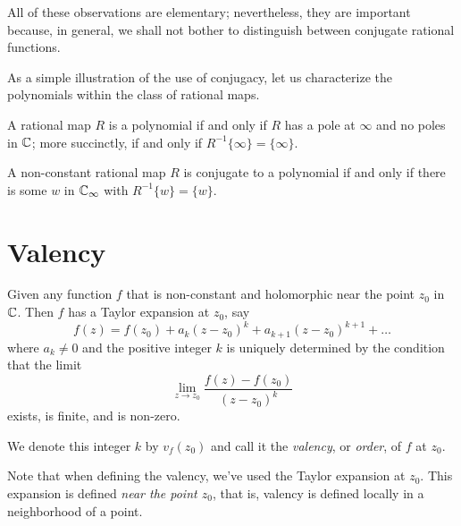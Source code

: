 All of these observations are elementary; nevertheless, they are important
because, in general, we shall not bother to distinguish between conjugate
rational functions.

As a simple illustration of the use of conjugacy, let us characterize the
polynomials within the class of rational maps.

\begin{remark}
    A rational map $R$ is a polynomial if and only if $R$ has a pole at $\infty$
    and no poles in $\mathbb{C}$; more succinctly, if and only if $R^{-1}\{\infty\} =
    \{\infty\}$.
\end{remark}

\begin{theorem}
    \label{thm:characterization_of_the_conjugacy_class_of_the_polynomials}
    A non-constant rational map $R$ is conjugate to a polynomial if and only if
    there is some $w$ in $\mathbb{C}_\infty$ with $R^{-1}\{w\} = \{w\}$.
\end{theorem}

\section{Valency}
\label{sec:valency}

Given any function $f$ that is non-constant and holomorphic near the point $z_0$
in $\mathbb{C}$. Then $f$ has a Taylor expansion at $z_0$, say
\begin{equation*}
    f(z) = f(z_0) + a_k(z-z_0)^k + a_{k+1}(z-z_0)^{k+1} + \dots
\end{equation*}
where $a_k \neq 0$ and the positive integer $k$ is uniquely determined by the
condition that the limit
\begin{equation*}
    \lim_{z \to z_0} \frac{f(z)-f(z_0)}{(z-z_0)^k}
\end{equation*}
exists, is finite, and is non-zero. 

\begin{definition}[Valency of $f$ at $z_0 \in \C$]
    \label{def:valency_in_C}
    We denote this integer $k$ by $v_f(z_0)$ and call it the \emph{valency}, or
    \emph{order}, of $f$ at $z_0$.
\end{definition}

\begin{remark}
    Note that when defining the valency, we've used the Taylor expansion at
    $z_0$. This expansion is defined \emph{near the point $z_0$}, that is,
    valency is defined locally in a neighborhood of a point.
\end{remark}

